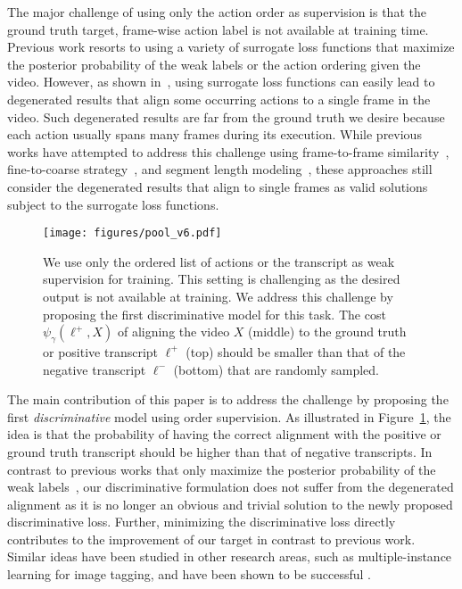 \documentclass[10pt,twocolumn,letterpaper]{article}
\begin{document}
The major challenge of using only the action order as supervision is that the ground truth target, frame-wise action label is not available at training time.  Previous work resorts to using a variety of surrogate loss functions that maximize the posterior probability of the weak labels or the action ordering given the video. However, as shown in~\cite{huang2016connectionist}, using surrogate loss functions can easily lead to degenerated results that align some occurring actions to a single frame in the video. Such degenerated results are far from the ground truth we desire because each action usually spans many frames during its execution. While previous works have attempted to address this challenge using frame-to-frame similarity~\cite{huang2016connectionist}, fine-to-coarse strategy~\cite{richard2017weakly}, and segment length modeling~\cite{richard2018neuralnetwork}, these approaches still consider the degenerated results that align to single frames as valid solutions subject to the surrogate loss functions.

\begin{figure}[tb]
\centering
\texttt{[image: figures/pool\_v6.pdf]}
\caption{
   We use only the ordered list of actions or the transcript as weak supervision for training. 
   This setting is challenging as the desired output is not available at training. We address this challenge by proposing the first discriminative model for this task. The cost $\psi_\gamma(\ell^+, X)$ of aligning the video $X$ (middle) to the ground truth or positive transcript $\ell^+$ (top) should be smaller than that of the negative transcript $\ell^-$ (bottom) that are randomly sampled.
   }
   \vspace{-1mm}
\label{fig:fig1}
\end{figure}


{The main contribution of this paper is to address the challenge by proposing the first \emph{discriminative} model using order supervision. As illustrated in Figure~\ref{fig:fig1}, the idea is that the probability of having the correct alignment with the positive or ground truth transcript should be higher than that of negative transcripts. In contrast to previous works that only maximize the posterior probability of the weak labels~\cite{huang2016connectionist,richard2017weakly,richard2018neuralnetwork}, our discriminative formulation does not suffer from the degenerated alignment as it is no longer an obvious and trivial solution to the newly proposed discriminative loss. } Further, minimizing the discriminative loss directly contributes to the improvement of our target in contrast to previous work. Similar ideas have been studied in other research areas, such as multiple-instance learning for image tagging, and have been shown to be successful \cite{wu2015deep}.
\end{document}

